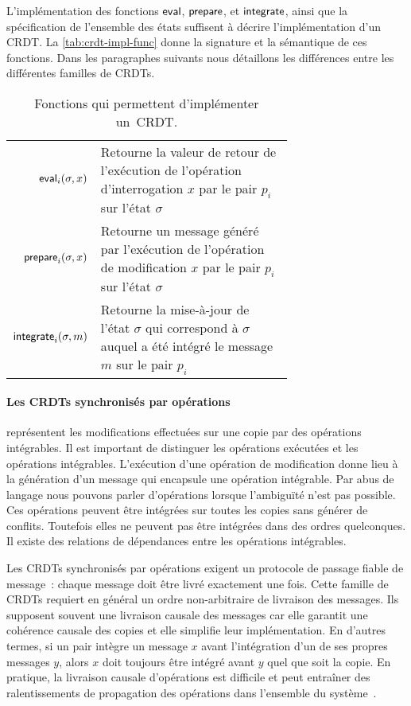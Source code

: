 L'implémentation des fonctions $\operatorname{\mathsf{eval}}$, $\operatorname{\mathsf{prepare}}$, et $\operatorname{\mathsf{integrate}}$, ainsi que la spécification de l'ensemble des états suffisent à décrire l'implémentation d'un \ac{CRDT}.
La \autoref{tab:crdt-impl-func} donne la signature et la sémantique de ces fonctions.
Dans les paragraphes suivants nous détaillons les différences entre les différentes familles de \acp{CRDT}.

\begin{table}[htb]
\centering
\begin{tabular}{rp{0.7\linewidth}}
    $\operatorname{\mathsf{eval}}_i(\sigma, x)$ & Retourne la valeur de retour de l'exécution de l'opération d'interrogation $x$ par le pair $p_i$ sur l'état $\sigma$ \\
    $\operatorname{\mathsf{prepare}}_i(\sigma, x)$ & Retourne un message généré par l'exécution de l'opération de modification $x$ par le pair $p_i$ sur l'état $\sigma$ \\
    $\operatorname{\mathsf{integrate}}_i(\sigma, m)$ & Retourne la mise-à-jour de l'état $\sigma$ qui correspond à $\sigma$ auquel a été intégré le message $m$ sur le pair $p_i$\\
\end{tabular}
\caption[Fonctions qui permettent d'implémenter un~\ac{CRDT}]{Fonctions qui permettent d'implémenter un~\ac{CRDT}.}\label{tab:crdt-impl-func}
\end{table}


\paragraph{Les \acp{CRDT} synchronisés par opérations~\autocite{baquero_2014_pure-op-crdt,baquero_2018_pure-op-crdt}} représentent les modifications effectuées sur une copie par des opérations intégrables.
Il est important de distinguer les opérations exécutées et les opérations intégrables.
L'exécution d'une opération de modification donne lieu à la génération d'un message qui encapsule une opération intégrable.
Par abus de langage nous pouvons parler d'opérations lorsque l'ambiguïté n'est pas possible.
Ces opérations peuvent être intégrées sur toutes les copies sans générer de conflits.
Toutefois elles ne peuvent pas être intégrées dans des ordres quelconques.
Il existe des relations de dépendances entre les opérations intégrables.

Les \acp{CRDT} synchronisés par opérations exigent un protocole de passage fiable de message~: chaque message doit être livré exactement une fois.
Cette famille de \acp{CRDT} requiert en général un ordre non-arbitraire de livraison des messages.
Ils supposent souvent une livraison causale des messages car elle garantit une cohérence causale des copies et elle simplifie leur implémentation.
En d'autres termes, si un pair intègre un message $x$ avant l'intégration d'un de ses propres messages $y$, alors $x$ doit toujours être intégré avant $y$ quel que soit la copie.
En pratique, la livraison causale d'opérations est difficile et peut entraîner des ralentissements de propagation des opérations dans l'ensemble du système~\autocite{alvisi_2017_writes-dirty-secret}.


